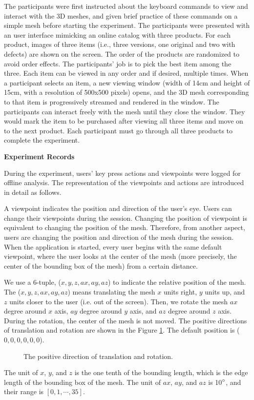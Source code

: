 The participants were first instructed about the keyboard commands 
to view and interact with the 3D meshes, and given brief practice of
these commands on a simple mesh before starting the experiment. The
participants were presented with an user interface mimicking an online
catalog with three products.  For each product, images of three items 
(i.e., three versions, one original and two with defects) are shown on the screen.
The order of the products are randomized to avoid order effects.
The participants' job is to pick the best item among the three. Each item 
can be viewed in any order and if desired, multiple times.  When 
a participant selects an item, a new viewing window (width of 14cm and
height of 15cm, with a resolution of 500x500 pixels) opens, and the 3D mesh corresponding to that item is
progressively streamed and rendered in the window.  
The participants can interact freely
with the mesh until they close the window.
They would mark the item to be purchased after viewing all three items and
move on to the next product. Each participant must go through all three products to
complete the experiment.

\textbf{Experiment Records}

During the experiment, users' key press actions and viewpoints
were logged for offline analysis. The representation of the viewpoints
and actions are introduced in detail as follows.

A viewpoint indicates the position and direction of the user's eye.
Users can change their viewpoints during the session. Changing the position of 
viewpoint is equivalent to changing the position of the mesh. Therefore, from another aspect,
users are changing the position and direction of the mesh during the session.
When the application is started, every user begins with the same default viewpoint,
where the user looks at the center of the mesh (more precisely,  the center of the bounding box of the mesh)
from a certain distance. 

We use a 6-tuple, ($x, y, z, ax, ay, az$) to indicate the relative position of the mesh. 
The ($x, y, z, ax, ay, az$) means
translating the mesh $x$ units right, $y$ units up, and $z$ units closer to the user (i.e. out of the screen). 
Then, we rotate the mesh $ax$ degree around $x$ axis, $ay$ degree around $y$ axis,
and $az$ degree around $z$ axis. During the rotation, the center of the mesh is not moved.
The positive directions of translation and rotation are shown in the Figure \ref{f:user:viewpoint}.
The default position is ($0, 0, 0, 0, 0, 0$).
\begin{figure}
    \centering
    \caption{The positive direction of translation and rotation.}
    \label{f:user:viewpoint}
\end{figure}
The unit of $x$, 
$y$, and $z$ is the one tenth of the bounding length, which is the edge length
of the bounding box of the mesh. The unit of $ax$, $ay$, and $az$ is 10$^\circ$,
and their range is $[0, 1, \cdots, 35]$.

